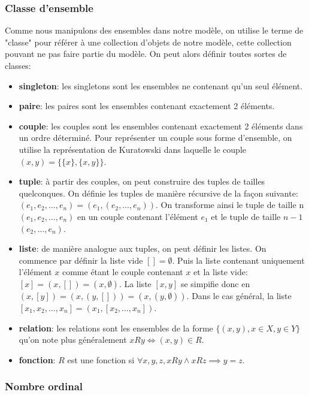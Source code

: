 \documentclass[a4paper, 11pt]{article}
\begin{document}
\subsubsection{Classe d'ensemble}

Comme nous manipulons des ensembles dans notre modèle, on utilise le terme
de "classe" pour référer à une collection d'objets de notre modèle, cette collection
pouvant ne pas faire partie du modèle. \cite{devlin_1981}
On peut alors définir toutes sortes de classes:

\begin{itemize}
    \item \textbf{singleton}: les singletons sont les ensembles ne contenant qu'un seul élément. 
    \item \textbf{paire}: les paires sont les ensembles contenant exactement 2 éléments.
    \item \textbf{couple}: les couples sont les ensembles contenant exactement 2 éléments dans un ordre déterminé.
    Pour représenter un couple sous forme d'ensemble, on utilise la représentation de 
    Kuratowski \cite{kuratowski1921notion} dans laquelle le couple $(x,y) = \{\{x\}, \{x, y\}\}$.
    \item \textbf{tuple}: à partir des couples, on peut construire des tuples de tailles quelconques.
    On définie les tuples de manière récursive de la façon suivante: 
    $(e_1, e_2, \dots, e_n) = (e_1, (e_2, \dots, e_n))$. On transforme ainsi le tuple
    de taille n $(e_1, e_2, \dots, e_n)$ en un couple contenant l'élément $e_1$ et le
    tuple de taille $n-1$ $(e_2, \dots, e_n)$.
    \item \textbf{liste}: de manière analogue aux tuples, on peut définir les listes.
    On commence par définir la liste vide $[] = \emptyset$. Puis la liste contenant 
    uniquement l'élément $x$ comme étant le couple contenant $x$ et la liste vide:
     $[x] = (x, []) = (x, \emptyset)$.
    La liste $[x, y]$ se simpifie donc en $(x, [y]) = (x, (y, [])) = (x, (y, \emptyset))$.
    Dans le cas général, la liste $[x_1, x_2, \dots, x_n] = (x_1, [x_2, \dots, x_n])$.
    \item \textbf{relation}: les relations sont les ensembles de la forme 
    $\{(x, y), x \in X, y \in Y\}$ qu'on note plus généralement $xRy \iff (x, y) \in R$.
    \item \textbf{fonction}: $R$ est une fonction si $\forall x, y, z, xRy \wedge xRz \implies y = z$.
\end{itemize}

\subsubsection{Nombre ordinal}
\end{document}
